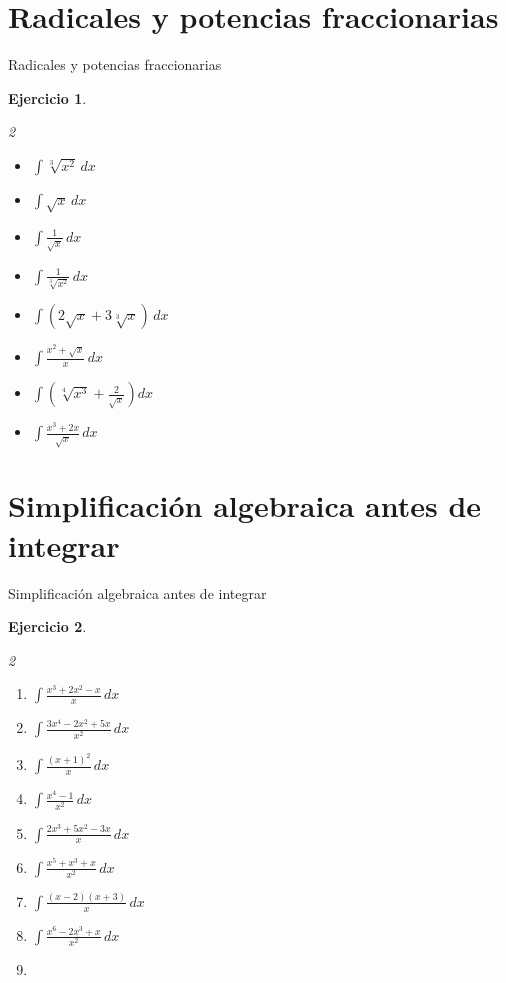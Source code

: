 \documentclass[10pt,aspectratio=169]{beamer}
\newtheorem{Ejer}{Ejercicio}
\begin{document}
\section{Radicales y potencias fraccionarias}
\begin{frame}{Radicales y potencias fraccionarias}
\begin{Ejer}
\begin{multicols}{2}
\begin{itemize}
\item $\displaystyle \int \sqrt[3]{x^2}\,dx$
\item $\displaystyle \int \sqrt{x}\,dx$
\item $\displaystyle \int \frac{1}{\sqrt{x}}\,dx$
\item $\displaystyle \int \frac{1}{\sqrt[3]{x^2}}\,dx$
\item $\displaystyle \int(2\sqrt{x}+3\sqrt[3]{x})\,dx$
\item $\displaystyle \int\frac{x^2+\sqrt{x}}{x}\,dx$
\item $\displaystyle \int\left(\sqrt[4]{x^3}+\frac{2}{\sqrt{x}}\right)dx$
\item $\displaystyle \int\frac{x^3+2x}{\sqrt{x}}\,dx$
\end{itemize}
\end{multicols}
\end{Ejer}
\end{frame}

\section{Simplificación algebraica antes de integrar}
\begin{frame}{Simplificación algebraica antes de integrar}
\begin{Ejer}
\begin{multicols}{2}
\begin{enumerate}
\item $\displaystyle \int\frac{x^3+2x^2-x}{x}\,dx$
\item $\displaystyle \int\frac{3x^4-2x^2+5x}{x^2}\,dx$
\item $\displaystyle \int\frac{(x+1)^2}{x}\,dx$
\item $\displaystyle \int\frac{x^4-1}{x^2}\,dx$
\item $\displaystyle \int\frac{2x^3+5x^2-3x}{x}\,dx$
\item $\displaystyle \int\frac{x^5+x^3+x}{x^2}\,dx$
\item $\displaystyle \int\frac{(x-2)(x+3)}{x}\,dx$
\item $\displaystyle \int\frac{x^6-2x^3+x}{x^2}\,dx$
\item 
\end{enumerate}
\end{multicols}
\end{Ejer}

 \end{frame}
\end{document}
